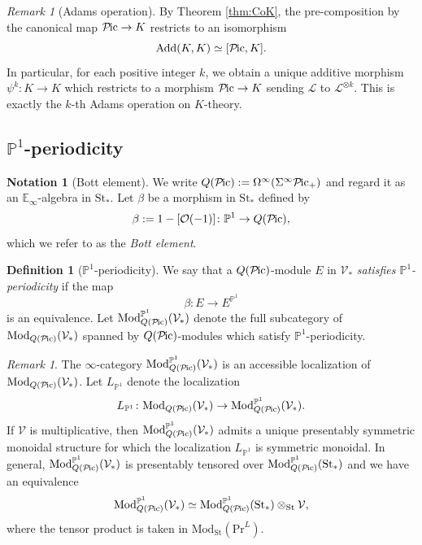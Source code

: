 \documentclass{amsart}
\theoremstyle{plain}
\theoremstyle{definition}
\newtheorem{definition}[theorem]{Definition}
\newtheorem{notation}[theorem]{Notation}
\theoremstyle{remark}
\newtheorem{remark}[theorem]{Remark}
\numberwithin{equation}{theorem}
\newcommand{\mcal}[1]{\mathcal{#1}}
\newcommand{\mbb}[1]{\mathbb{#1}}
\newcommand{\Add}{\mathrm{Add}}
\newcommand{\Mod}{\mathrm{Mod}}
\renewcommand{\Pr}{\mathrm{Pr}}
\newcommand{\St}{\mathrm{St}}
\newcommand{\V}{\mathcal{V}}
\newcommand{\Pic}{{\mathcal{P}\mspace{-2.0mu}\mathrm{ic}}}
\begin{document}
\begin{remark}[Adams operation]
By Theorem \ref{thm:CoK}, the pre-composition by the canonical map $\Pic\to K$ restricts to an isomorphism
\[
	\Add(K,K) \simeq [\Pic,K].
\]
In particular, for each positive integer $k$, we obtain a unique additive morphism $\psi^k\colon K\to K$ which restricts to a morphism $\Pic\to K$ sending $\mcal{L}$ to $\mcal{L}^{\otimes k}$.
This is exactly the $k$-th Adams operation on $K$-theory.
\end{remark}


\subsection{$\mbb{P}^1$-periodicity}\label{Per}

\begin{notation}[Bott element]
We write $Q(\Pic):=\Omega^\infty(\Sigma^\infty\Pic_+)$ and regard it as an $\mbb{E}_\infty$-algebra in $\St_*$.
Let $\beta$ be a morphism in $\St_*$ defined by
\[
	\beta := 1-[\mcal{O}(-1)] \colon \mbb{P}^1 \to Q(\Pic),
\]
which we refer to as the \textit{Bott element}.
\end{notation}

\begin{definition}[$\mbb{P}^1$-periodicity]\label{def:Per}
We say that a $Q(\Pic)$-module $E$ in $\V_*$ \textit{satisfies $\mbb{P}^1$-periodicity} if the map
\[
	\beta \colon E \to E^{\mbb{P}^1}
\]
is an equivalence.
Let $\Mod_{Q(\Pic)}^{\mbb{P}^1}(\V_*)$ denote the full subcategory of $\Mod_{Q(\Pic)}(\V_*)$ spanned by $Q(\Pic)$-modules which satisfy $\mbb{P}^1$-periodicity.
\end{definition}

\begin{remark}
The $\infty$-category $\Mod_{Q(\Pic)}^{\mbb{P}^1}(\V_*)$ is an accessible localization of $\Mod_{Q(\Pic)}(\V_*)$.
Let $L_{\mbb{P}^1}$ denote the localization
\[
	L_{\mbb{P}^1} \colon \Mod_{Q(\Pic)}(\V_*) \to \Mod_{Q(\Pic)}^{\mbb{P}^1}(\V_*).
\]
If $\V$ is multiplicative, then $\Mod_{Q(\Pic)}^{\mbb{P}^1}(\V_*)$ admits a unique presentably symmetric monoidal structure for which the localization $L_{\mbb{P}^1}$ is symmetric monoidal.
In general, $\Mod_{Q(\Pic)}^{\mbb{P}^1}(\V_*)$ is presentably tensored over $\Mod_{Q(\Pic)}^{\mbb{P}^1}(\St_*)$ and we have an equivalence
\[
	\Mod_{Q(\Pic)}^{\mbb{P}^1}(\V_*) \simeq \Mod_{Q(\Pic)}^{\mbb{P}^1}(\St_*)\otimes_\St\V,
\]
where the tensor product is taken in $\Mod_\St(\Pr^L)$.
\end{remark}
\end{document}

